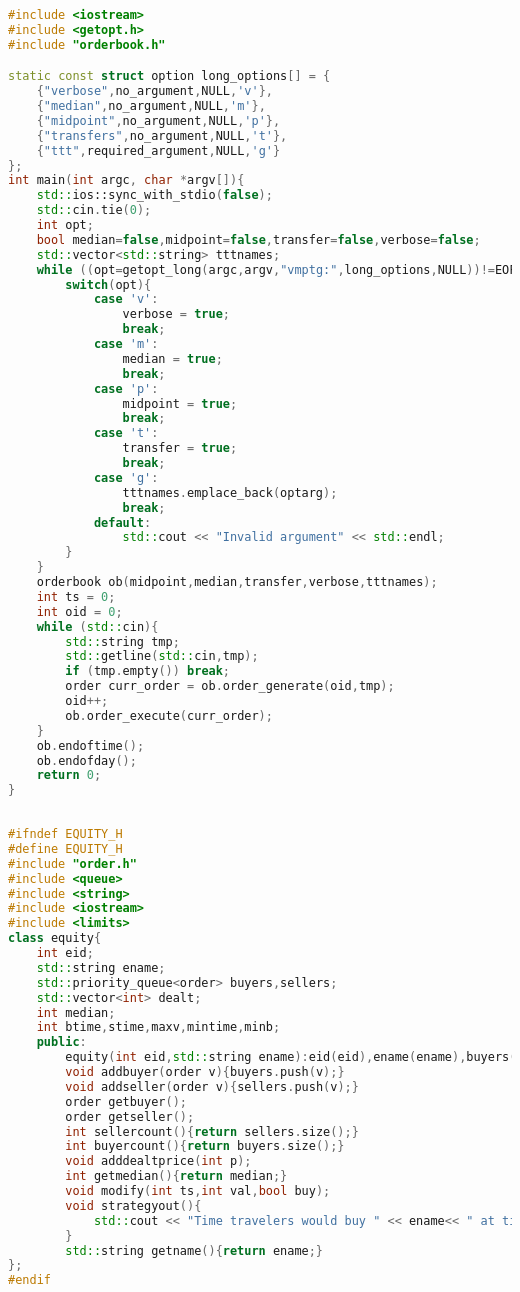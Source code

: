\documentclass{article}
\begin{document}
\begin{lstlisting}[title=main.cpp,language=C++]
#include <iostream>
#include <getopt.h>
#include "orderbook.h"

static const struct option long_options[] = {
    {"verbose",no_argument,NULL,'v'},
    {"median",no_argument,NULL,'m'},
    {"midpoint",no_argument,NULL,'p'},
    {"transfers",no_argument,NULL,'t'},
    {"ttt",required_argument,NULL,'g'}
};
int main(int argc, char *argv[]){
    std::ios::sync_with_stdio(false);
    std::cin.tie(0);
    int opt;
    bool median=false,midpoint=false,transfer=false,verbose=false;
    std::vector<std::string> tttnames;
    while ((opt=getopt_long(argc,argv,"vmptg:",long_options,NULL))!=EOF){
        switch(opt){
            case 'v':
                verbose = true;
                break;
            case 'm':
                median = true;
                break;
            case 'p':
                midpoint = true;
                break;
            case 't':
                transfer = true;
                break;
            case 'g':
                tttnames.emplace_back(optarg);
                break;
            default:
                std::cout << "Invalid argument" << std::endl;
        }
    }
    orderbook ob(midpoint,median,transfer,verbose,tttnames);
    int ts = 0;
    int oid = 0;
    while (std::cin){
        std::string tmp;
        std::getline(std::cin,tmp);
        if (tmp.empty()) break;
        order curr_order = ob.order_generate(oid,tmp);
        oid++;
        ob.order_execute(curr_order);
    }
    ob.endoftime();
    ob.endofday();
    return 0;
}
    
\end{lstlisting}
\begin{lstlisting}[title=equity.h,language=C++]
#ifndef EQUITY_H
#define EQUITY_H
#include "order.h"
#include <queue>
#include <string>
#include <iostream>
#include <limits>
class equity{
    int eid;
    std::string ename;
    std::priority_queue<order> buyers,sellers;
    std::vector<int> dealt;
    int median;
    int btime,stime,maxv,mintime,minb;
    public:
        equity(int eid,std::string ename):eid(eid),ename(ename),buyers(),sellers(),dealt(),median(-1),btime(-1),stime(-1),mintime(-1),minb(INT32_MAX),maxv(INT32_MIN){}
        void addbuyer(order v){buyers.push(v);}
        void addseller(order v){sellers.push(v);}
        order getbuyer();
        order getseller();
        int sellercount(){return sellers.size();}
        int buyercount(){return buyers.size();}
        void adddealtprice(int p);
        int getmedian(){return median;}
        void modify(int ts,int val,bool buy);
        void strategyout(){
            std::cout << "Time travelers would buy " << ename<< " at time: "<< btime <<" and sell it at time: "<< stime << std::endl;
        }
        std::string getname(){return ename;}
};
#endif
\end{lstlisting}
\end{document}
